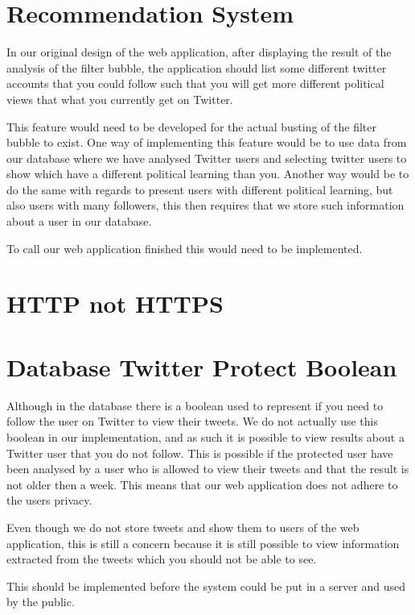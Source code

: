 \section{Recommendation System}
In our original design of the web application, after displaying the result of
the analysis of the filter bubble, the application should list some different
twitter accounts that you could follow such that you will get more different
political views that what you currently get on Twitter. \nl

This feature would need to be developed for the actual busting of the filter
bubble to exist. One way of implementing this feature would be to use data from
our database where we have analysed Twitter users and selecting twitter users to
show which have a different political learning than you. Another way would be to
do the same with regards to present users with different political learning, but
also users with many followers, this then requires that we store such
information about a user in our database.\nl

To call our web application finished this would need to be implemented.

\section{HTTP not HTTPS}

\section{Database Twitter Protect Boolean}\label{sec:twitterProtect}
Although in the database there is a boolean used to represent if you need to
follow the user on Twitter to view their tweets. We do not actually use this
boolean in our implementation, and as such it is possible to view results about
a Twitter user that you do not follow. This is possible if the protected user
have been analysed by a user who is allowed to view their tweets and that the
result is not older then a week. This means that our web application does not
adhere to the users privacy. \nl

Even though we do not store tweets and show them to users of the web
application, this is still a concern because it is still possible to view
information extracted from the tweets which you should not be able to see. \nl

This should be implemented before the system could be put in a server and used
by the public.
